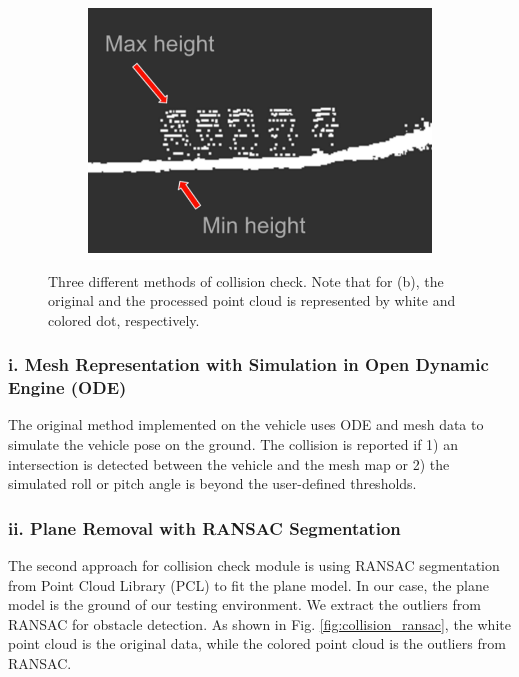 \documentclass[../thesis.tex]{subfiles}
\begin{document}
\begin{figure}[t]
\begin{subfigure}[b]{0.3\linewidth}
    	 \includegraphics[width=\columnwidth]{./RRTPlanner/fig/height_map.png}
           	\label{fig:collision_height_map}
    	\end{subfigure}
    	\caption{Three different methods of collision check. Note that for (b), the original and the processed point cloud is represented by white and colored dot, respectively.}
	\label{fig:collision}
\end{figure}
 
 
\subsubsection{i. Mesh Representation with Simulation in Open Dynamic Engine (ODE) \cite{wettergreen2012developing}}
The original method implemented on the vehicle uses ODE and mesh data to simulate the vehicle pose on the ground. 
The collision is reported if 1) an intersection is detected between the vehicle and the mesh map or 2) the simulated roll or pitch angle is beyond the user-defined thresholds.
 
\subsubsection{ii. Plane Removal with RANSAC Segmentation \cite{fischler1981random}}
The second approach for collision check module is using RANSAC segmentation from Point Cloud Library (PCL) to fit the plane model. 
In our case, the plane model is the ground of our testing environment. 
We extract the outliers from RANSAC for obstacle detection. 
As shown in Fig. \ref{fig:collision_ransac}, the white point cloud is the original data, while the colored point cloud is the outliers from RANSAC.
 
\end{document}
